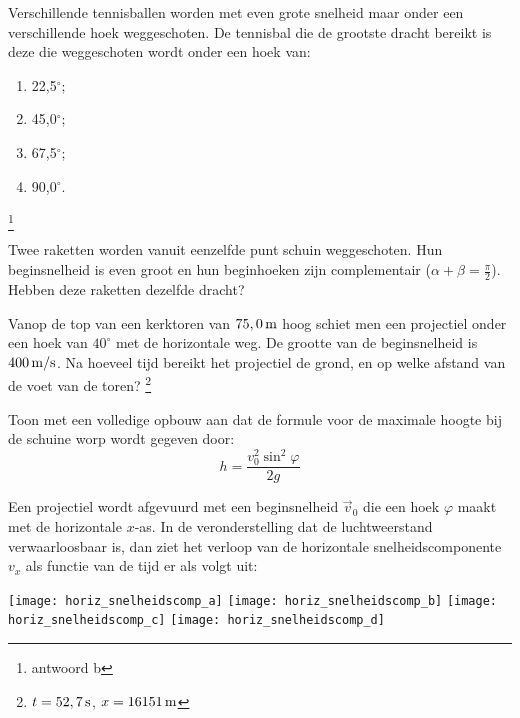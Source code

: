 \documentclass{ximera}
\begin{document}
\begin{exercise} Verschillende tennisballen worden met even grote snelheid maar
onder een verschillende hoek weggeschoten. De tennisbal die de
grootste dracht bereikt is deze die weggeschoten wordt onder een
hoek van:
\begin{enumerate}
\item 22,5$^\circ$;
\item 45,0$^\circ$;
\item 67,5$^\circ$;
\item 90,0$^\circ$.
\end{enumerate}
\footnote{antwoord b}

\end{exercise}

\begin{exercise} Twee raketten worden vanuit eenzelfde punt schuin
weggeschoten. Hun beginsnelheid is even groot en hun beginhoeken
zijn complementair ($\alpha+\beta=\frac{\pi}{2}$). Hebben deze
raketten dezelfde dracht?

\end{exercise}

\begin{exercise} Vanop de top van een kerktoren van $75,0\rm\,m$ hoog schiet
men een projectiel onder een hoek van $40^\circ$ met de horizontale
weg. De grootte van de beginsnelheid is $400\rm\,m/s$. Na hoeveel
tijd bereikt het projectiel de grond, en op welke afstand van de
voet van de toren? \footnote{$t=52,7\rm\,s$, $x=16151\rm\,m$}

\end{exercise}

\begin{exercise} Toon met een volledige opbouw aan dat de formule voor de
maximale hoogte bij de schuine worp wordt gegeven door:
\begin{displaymath}
h=\frac{v_0^2\sin^2{\varphi}}{2g}
\end{displaymath}

\end{exercise}

\begin{exercise} Een projectiel wordt afgevuurd met een beginsnelheid
$\vec{v}_0$ die een hoek $\varphi$ maakt met de horizontale
\mbox{$x$-as}.
In de veronderstelling dat de luchtweerstand verwaarloosbaar is, dan
ziet het verloop van de horizontale snelheidscomponente $v_x$ als
functie van de tijd er als volgt uit:
\begin{image}
\texttt{[image: horiz\_snelheidscomp\_a]}
\texttt{[image: horiz\_snelheidscomp\_b]}
\texttt{[image: horiz\_snelheidscomp\_c]}
\texttt{[image: horiz\_snelheidscomp\_d]}
\end{image}

\end{exercise}
\end{document}
